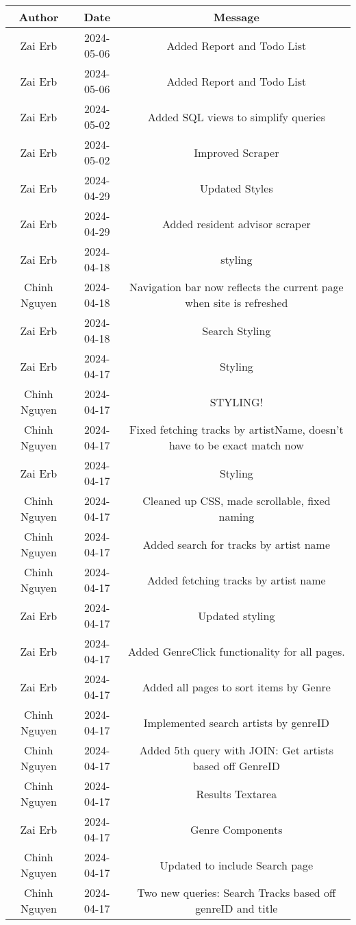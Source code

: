 \begin{tabular}{|c|c|c|}
\hline
Author & Date & Message \\
\hline
Zai Erb & 2024-05-06 & Added Report and Todo List \\
Zai Erb & 2024-05-06 & Added Report and Todo List \\
Zai Erb & 2024-05-02 & Added SQL views to simplify queries \\
Zai Erb & 2024-05-02 & Improved Scraper \\
Zai Erb & 2024-04-29 & Updated Styles \\
Zai Erb & 2024-04-29 & Added resident advisor scraper \\
Zai Erb & 2024-04-18 & styling \\
Chinh Nguyen & 2024-04-18 & Navigation bar now reflects the current page when site is refreshed \\
Zai Erb & 2024-04-18 & Search Styling \\
Zai Erb & 2024-04-17 & Styling \\
Chinh Nguyen & 2024-04-17 & STYLING! \\
Chinh Nguyen & 2024-04-17 & Fixed fetching tracks by artistName, doesn't have to be exact match now \\
Zai Erb & 2024-04-17 & Styling \\
Chinh Nguyen & 2024-04-17 & Cleaned up CSS, made scrollable, fixed naming \\
Chinh Nguyen & 2024-04-17 & Added search for tracks by artist name \\
Chinh Nguyen & 2024-04-17 & Added fetching tracks by artist name \\
Zai Erb & 2024-04-17 & Updated styling \\
Zai Erb & 2024-04-17 & Added GenreClick functionality for all pages. \\
Zai Erb & 2024-04-17 & Added all pages to sort items by Genre \\
Chinh Nguyen & 2024-04-17 & Implemented search artists by genreID \\
Chinh Nguyen & 2024-04-17 & Added 5th query with JOIN: Get artists based off GenreID \\
Chinh Nguyen & 2024-04-17 & Results Textarea \\
Zai Erb & 2024-04-17 & Genre Components \\
Chinh Nguyen & 2024-04-17 & Updated to include Search page \\
Chinh Nguyen & 2024-04-17 & Two new queries: Search Tracks based off genreID and title \\

\end{tabular}
